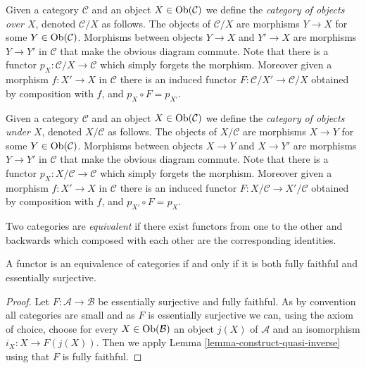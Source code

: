 \begin{example}
\label{example-category-over-X}
Given a category $\mathcal{C}$ and an object
$X\in \mathop{\mathrm{Ob}}\nolimits(\mathcal{C})$
we define the {\it category of objects over
$X$},
denoted $\mathcal{C}/X$ as follows.
The objects of $\mathcal{C}/X$ are morphisms
$Y\to X$ for
some $Y\in \mathop{\mathrm{Ob}}\nolimits(\mathcal{C})$. Morphisms
between objects
$Y\to X$ and $Y'\to X$ are morphisms $Y\to
Y'$ in $\mathcal{C}$ that
make the obvious diagram commute. Note that
there is a functor
$p_X : \mathcal{C}/X\to \mathcal{C}$ which
simply forgets the
morphism. Moreover given a morphism $f :
X'\to X$ in
$\mathcal{C}$ there is an induced functor
$F : \mathcal{C}/X' \to \mathcal{C}/X$
obtained by composition with $f$,
and $p_X\circ F = p_{X'}$.
\end{example}

\begin{example}
\label{example-category-under-X}
Given a category $\mathcal{C}$ and an object
$X\in \mathop{\mathrm{Ob}}\nolimits(\mathcal{C})$
we define the {\it category of objects under
$X$},
denoted $X/\mathcal{C}$ as follows.
The objects of $X/\mathcal{C}$ are morphisms
$X\to Y$ for
some $Y\in \mathop{\mathrm{Ob}}\nolimits(\mathcal{C})$. Morphisms
between objects
$X\to Y$ and $X\to Y'$ are morphisms $Y\to
Y'$ in $\mathcal{C}$ that
make the obvious diagram commute. Note that
there is a functor
$p_X : X/\mathcal{C}\to \mathcal{C}$ which
simply forgets the
morphism. Moreover given a morphism $f :
X'\to X$ in
$\mathcal{C}$ there is an induced functor
$F : X/\mathcal{C} \to X'/\mathcal{C}$
obtained by composition with $f$,
and $p_{X'}\circ F = p_X$.
\end{example}

\begin{definition}
\label{definition-equivalence-of-categories}
Two categories are {\it equivalent} if there
exist functors
from one to the other and backwards which
composed with
each other are the corresponding identities.
\end{definition}

\begin{lemma}
\label{lemma-equivalence-categories}
A functor is an equivalence of categories if
and only if it is both fully
faithful and essentially surjective.
\end{lemma}

\begin{proof}
Let $F : \mathcal{A} \to \mathcal{B}$ be
essentially surjective and fully
faithful. As by convention all categories are
small and as $F$ is essentially
surjective we can, using the axiom of choice,
choose for every
$X \in \mathop{\mathrm{Ob}}\nolimits(\mathcal{B})$ an object $j(X)$ of
$\mathcal{A}$ and an
isomorphism $i_X : X \to F(j(X))$. Then we
apply
Lemma \ref{lemma-construct-quasi-inverse}
using that $F$ is fully faithful.
\end{proof}

